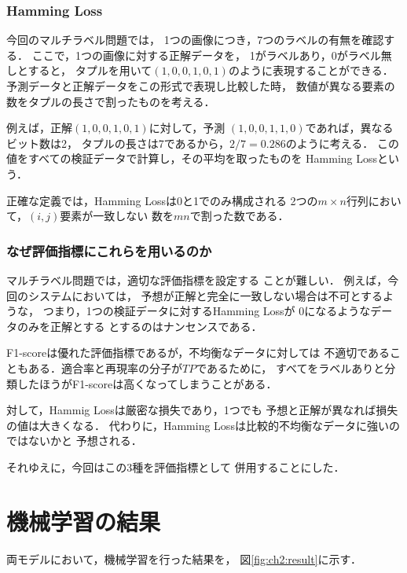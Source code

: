 \subsubsection{Hamming Loss}
今回のマルチラベル問題では，
1つの画像につき，7つのラベルの有無を確認する．
ここで，1つの画像に対する正解データを，
1がラベルあり，0がラベル無しとすると，
タプルを用いて$(1,0,0,1,0,1)$のように表現することができる．
予測データと正解データをこの形式で表現し比較した時，
数値が異なる要素の数をタプルの長さで割ったものを考える．

例えば，正解$(1,0,0,1,0,1)$に対して，予測
$(1,0,0,1,1,0)$であれば，異なるビット数は2，
タプルの長さは7であるから，$2/7 = 0.286$のように考える．
この値をすべての検証データで計算し，その平均を取ったものを
Hamming Lossという．

正確な定義では，Hamming Lossは0と1でのみ構成される
2つの$m \times n$行列において，$(i,j)$要素が一致しない
数を$mn$で割った数である．
\subsubsection{なぜ評価指標にこれらを用いるのか}
マルチラベル問題では，適切な評価指標を設定する
ことが難しい．
例えば，今回のシステムにおいては，
予想が正解と完全に一致しない場合は不可とするような，
つまり，1つの検証データに対するHamming Lossが
0になるようなデータのみを正解とする
とするのはナンセンスである．

F1-scoreは優れた評価指標であるが，不均衡なデータに対しては
不適切であることもある．適合率と再現率の分子が$TP$であるために，
すべてをラベルありと分類したほうがF1-scoreは高くなってしまうことがある．

対して，Hammig Lossは厳密な損失であり，1つでも
予想と正解が異なれば損失の値は大きくなる．
代わりに，Hamming Lossは比較的不均衡なデータに強いのではないかと
予想される．

それゆえに，今回はこの3種を評価指標として
併用することにした．
\section{機械学習の結果}
両モデルにおいて，機械学習を行った結果を，
図\ref{fig:ch2:result}に示す．

